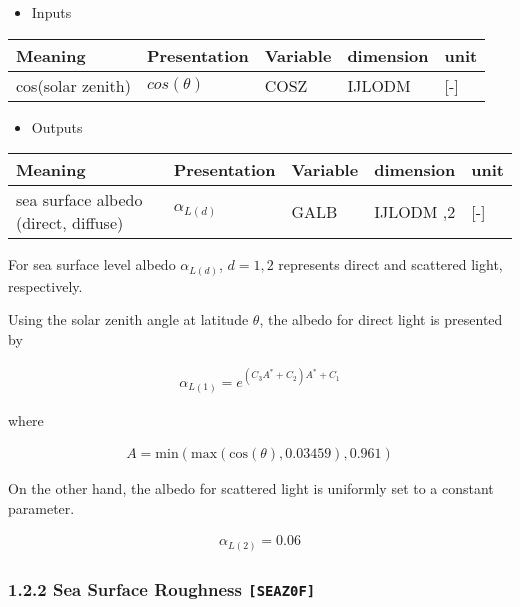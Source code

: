 \begin{itemize}
\tightlist
\item
  Inputs
\end{itemize}

\setlength\LTleft{0pt}\setlength\LTright{0pt}\begin{longtable}[]{@{}lllll@{}}
\toprule\relax
Meaning & Presentation & Variable & dimension & unit \\
\midrule\relax
\endhead
cos(solar zenith) & \(cos(\theta)\) & COSZ & IJLODM & {[}-{]} \\
\bottomrule
\end{longtable}

\begin{itemize}
\tightlist
\item
  Outputs
\end{itemize}

\setlength\LTleft{0pt}\setlength\LTright{0pt}\begin{longtable}[]{@{}lllll@{}}
\toprule\relax
Meaning & Presentation & Variable & dimension & unit \\
\midrule\relax
\endhead
sea surface albedo (direct, diffuse) & \(\alpha_{L(d)}\) & GALB & IJLODM
,2 & {[}-{]} \\
\bottomrule
\end{longtable}

For sea surface level albedo \(\alpha_{L(d)}\), \(d=1,2\) represents
direct and scattered light, respectively.

Using the solar zenith angle at latitude \(\theta\), the albedo for
direct light is presented by

\begin{eqnarray}
    \alpha_{L(1)} = e^{(C_3A^* + C_2) A^* +C_1}
\end{eqnarray}

where

\begin{eqnarray}
    A = \mathrm{min}(\mathrm{max}(\mathrm{cos}(\theta),0.03459),0.961)
\end{eqnarray}

On the other hand, the albedo for scattered light is uniformly set to a
constant parameter.

\begin{eqnarray}
    \alpha_{L(2)} = 0.06
\end{eqnarray}

\hypertarget{sea-surface-roughness-seaz0f}{%
\subsubsection{\texorpdfstring{1.2.2 Sea Surface Roughness
\texttt{{[}SEAZ0F{]}}}{1.2.2 Sea Surface Roughness {[}SEAZ0F{]}}}\label{sea-surface-roughness-seaz0f}}

